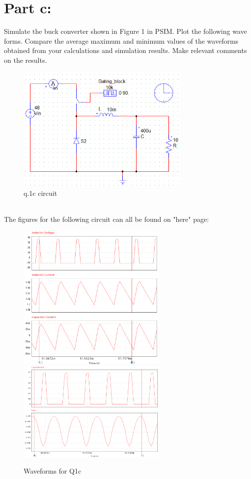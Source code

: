 \documentclass{article}
\begin{document}
\section*{Part c:}
Simulate the buck converter shown in Figure 1 in PSIM. Plot the following wave forms. Compare the average maximum and minimum values of the waveforms obtained from your calculations and simulation results. Make relevant comments on the results.
\begin{figure}[H]
    \centering
    \includegraphics[width=0.75\textwidth]{q1c-ciricuit.png}
    \caption{q.1c circuit}
\end{figure}
\\The figures for the following circuit can all be found on "here" page:
\begin{figure}[H]
    \centering
    \includegraphics[width=0.65\textwidth]{q1c-f1.png}
    \includegraphics[width=0.65\textwidth]{q1c-f2.png}\\
    \caption{Waveforms for Q1c}
\end{figure}
\end{document}
